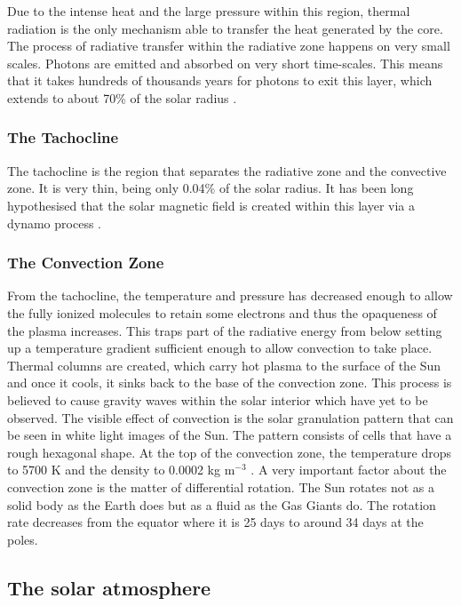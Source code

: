     Due to the intense heat and the large pressure within this region, thermal radiation is the only mechanism able to transfer the heat generated by the core.
    The process of radiative transfer within the radiative zone happens on very small scales.
    Photons are emitted and absorbed on very short time-scales. 
    This means that it takes hundreds of thousands years for photons to exit this layer, which extends to about 70\% of the solar radius \citep{cox1991solar}. 
        
\subsubsection{The Tachocline}

    The tachocline is the region that separates the radiative zone and the convective zone.
    It is very thin, being only 0.04\% of the solar radius.
    It has been long hypothesised that the solar magnetic field is created within this layer via a dynamo process \citep{soward2005fluid}.

\subsubsection{The Convection Zone}

    From the tachocline, the temperature and pressure has decreased enough to allow the fully ionized molecules to retain some electrons and thus the opaqueness of the plasma increases.
    This traps part of the radiative energy from below setting up a temperature gradient sufficient enough to allow convection to take place.
    Thermal columns are created, which carry hot plasma to the surface of the Sun and once it cools, it sinks back to the base of the convection zone.
    This process is believed to cause gravity waves within the solar interior which have yet to be observed.
    The visible effect of convection is the solar granulation pattern that can be seen in white light images of the Sun.  
    The pattern consists of cells that have a rough hexagonal shape. 
    At the top of the convection zone, the temperature drops to 5700 K and the density to 0.0002 kg m$^{-3}$ \citep{gai2000sun}. 
    A very important factor about the convection zone is the matter of differential rotation.
    The Sun rotates not as a solid body as the Earth does but as a fluid as the Gas Giants do. 
    The rotation rate decreases from the equator where it is 25 days to around 34 days at the poles.
    
\subsection{The solar atmosphere}
 
